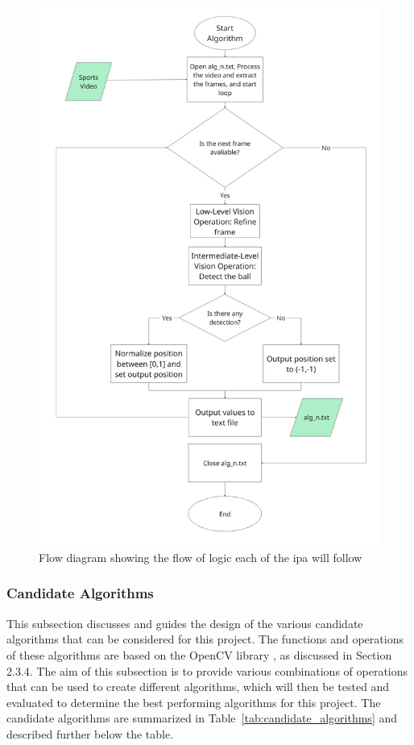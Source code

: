 \documentclass[12pt,a4paper]{article}
\begin{document}
\begin{figure}[H]
	\centering
	\includegraphics[width=1\textwidth]{ipa_flow.jpg}
	\caption{Flow diagram showing the flow of logic each of the \acs{ipa} will follow}
	\label{fig:ipaflow}
\end{figure}

\subsubsection{Candidate Algorithms}
This subsection discusses and guides the design of the various candidate algorithms that can be considered for this project. The functions and operations of these algorithms are based on the OpenCV library \parencite{opencv_library}, as discussed in Section 2.3.4. The aim of this subsection is to provide various combinations of operations that can be used to create different algorithms, which will then be tested and evaluated to determine the best performing algorithms for this project. The candidate algorithms are summarized in Table~\ref{tab:candidate_algorithms} and described further below the table.
\end{document}
